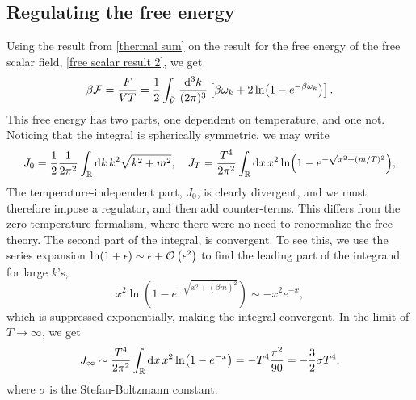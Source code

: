 \subsection{Regulating the free energy}
Using the result from \autoref{thermal sum} on the result for the free energy of the free scalar field, \autoref{free scalar result 2}, we get
\begin{equation}
    \label{free scalar free enrgy}
    \beta \mathcal{F} = \frac{F}{VT}
    = \frac{1}{2} \int_{\tilde V} \frac{\dd^3 k}{(2 \pi)^3}
    \left[
        \beta \omega_k + 2\ln(1 - e^{-\beta\omega_k})
    \right].
\end{equation}
This free energy has two parts, one dependent on temperature, and one not.
Noticing that the integral is spherically symmetric, we may write
\begin{equation}
    J_0 = \frac{1}{2} \frac{1}{2 \pi^2}\int_{\mathbb{R}} \dd k \, k^2 \sqrt{k^2 + m^2}, \quad
    J_T = \frac{T^4}{2 \pi^2}\int_{\mathbb{R}} \dd x \, x^2  \ln(1 - e^{-\sqrt{x^2 + (m/T)^2}}), 
\end{equation}
The temperature-independent part, $J_0$, is clearly divergent, and we must therefore impose a regulator, and then add counter-terms.
This differs from the zero-temperature formalism, where there were no need to renormalize the free theory.
The second part of the integral, is convergent. 
To see this, we use the series expansion $\ln(1 + \epsilon) \sim \epsilon + \mathcal{O}\left(\epsilon^{2}\right)$ to find the leading part of the integrand for large $k$'s, 
\begin{equation}
    x^2 \ln(1 - e^{-\sqrt{x^2 + (\beta m)^2}}) \sim - x^2 e^{-x}, 
\end{equation}
which is suppressed exponentially, making the integral convergent.
In the limit of $T \rightarrow \infty$, we get
\begin{equation}
    J_\infty \sim \frac{T^4}{2 \pi^2} \int_{\mathbb{R}} \dd x \, x^2 \ln(1 - e^{-x})
    = - T^4 \frac{\pi^2}{90} = -\frac{3}{2} \sigma T^4,
\end{equation}
where $\sigma$ is the Stefan-Boltzmann constant. 

